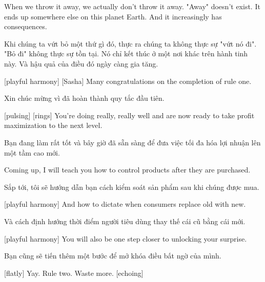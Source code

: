 \documentclass[a4paper]{article}
\begin{document}
	When we throw it away, we actually don't throw it away.
	"Away" doesn't exist.
	It ends up somewhere else on this planet Earth.
	And it increasingly has consequences.
	
	\begin{vietnamese-v2}
		Khi chúng ta vứt bỏ một thứ gì đó, thực ra chúng ta không thực sự "vứt nó đi". 
		"Bỏ đi" không thực sự tồn tại. 
		Nó chỉ kết thúc ở một nơi khác trên hành tinh này. 
		Và hậu quả của điều đó ngày càng gia tăng.
	\end{vietnamese-v2}
	
	[playful harmony]
	[Sasha] Many congratulations on the completion of rule one.
	
	\begin{vietnamese-v2}
		 Xin chúc mừng vì đã hoàn thành quy tắc đầu tiên.
	\end{vietnamese-v2}
	
	[pulsing]
	[rings]
	You're doing really, really well and are now ready to take profit maximization to the next level.
	
	\begin{vietnamese-v2}
		Bạn đang làm rất tốt và bây giờ đã sẵn sàng để đưa việc tối đa hóa lợi nhuận lên một tầm cao mới.
	\end{vietnamese-v2}
	
	Coming up, I will teach you how to control products after they are purchased.
	
	\begin{vietnamese-v2}
		Sắp tới, tôi sẽ hướng dẫn bạn cách kiểm soát sản phẩm sau khi chúng được mua.
	\end{vietnamese-v2}
	
	[playful harmony]
	And how to dictate when consumers replace old with new.
	
	\begin{vietnamese-v2}
		Và cách định hướng thời điểm người tiêu dùng thay thế cái cũ bằng cái mới.
	\end{vietnamese-v2}
	
	[playful harmony]
	You will also be one step closer to unlocking your surprise.
	
	\begin{vietnamese-v2}
		Bạn cũng sẽ tiến thêm một bước để mở khóa điều bất ngờ của mình.
	\end{vietnamese-v2}
	
	
	[flatly] Yay.
	Rule two.
	Waste more. [echoing]
	
\end{document}
